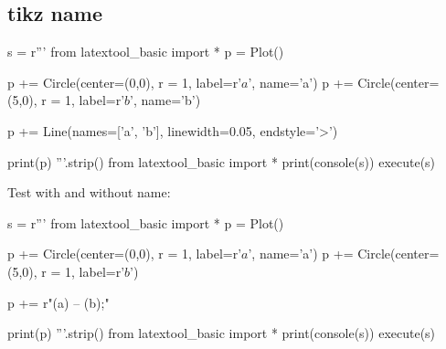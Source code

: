 \newpage
\subsection{tikz name}
\begin{python}
s = r'''
from latextool_basic import *
p = Plot()

p += Circle(center=(0,0), r = 1, label=r'$a$', name='a')
p += Circle(center=(5,0), r = 1, label=r'$b$', name='b')

p += Line(names=['a', 'b'], linewidth=0.05, endstyle='>')

print(p)
'''.strip()
from latextool_basic import *
print(console(s))
execute(s)
\end{python}


\newpage
Test with and without name:
\begin{python}
s = r'''
from latextool_basic import *
p = Plot()

p += Circle(center=(0,0), r = 1, label=r'$a$', name='a')
p += Circle(center=(5,0), r = 1, label=r'$b$')

p += r"\draw[->,line width=2] (a) -- (b);"

print(p)
'''.strip()
from latextool_basic import *
print(console(s))
execute(s)
\end{python}


